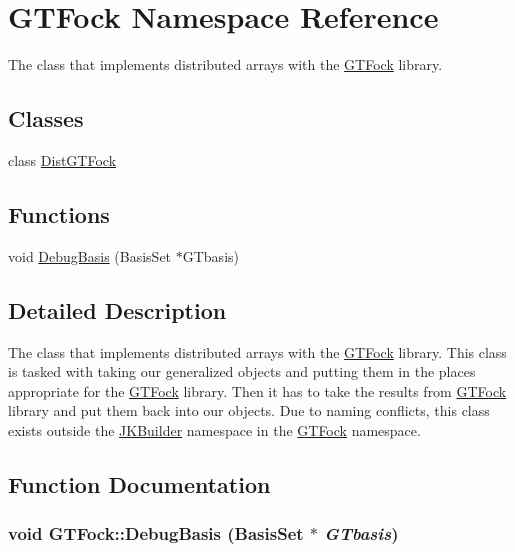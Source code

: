 \hypertarget{namespaceGTFock}{
\section{GTFock Namespace Reference}
\label{namespaceGTFock}
}


The class that implements distributed arrays with the \hyperlink{namespaceGTFock}{GTFock} library.  
\subsection*{Classes}
\begin{DoxyCompactItemize}
\item 
class \hyperlink{classGTFock_1_1DistGTFock}{DistGTFock}
\end{DoxyCompactItemize}
\subsection*{Functions}
\begin{DoxyCompactItemize}
\item 
void \hyperlink{namespaceGTFock_a9e4cb27d603e3109b98e47f38bc7e3a2}{DebugBasis} (BasisSet $\ast$GTbasis)
\end{DoxyCompactItemize}


\subsection{Detailed Description}
The class that implements distributed arrays with the \hyperlink{namespaceGTFock}{GTFock} library. This class is tasked with taking our generalized objects and putting them in the places appropriate for the \hyperlink{namespaceGTFock}{GTFock} library. Then it has to take the results from \hyperlink{namespaceGTFock}{GTFock} library and put them back into our objects. Due to naming conflicts, this class exists outside the \hyperlink{namespaceJKBuilder}{JKBuilder} namespace in the \hyperlink{namespaceGTFock}{GTFock} namespace. 

\subsection{Function Documentation}
\hypertarget{namespaceGTFock_a9e4cb27d603e3109b98e47f38bc7e3a2}{
\subsubsection[{DebugBasis}]{\setlength{\rightskip}{0pt plus 5cm}void GTFock::DebugBasis (BasisSet $\ast$ {\em GTbasis})}}
\label{namespaceGTFock_a9e4cb27d603e3109b98e47f38bc7e3a2}
